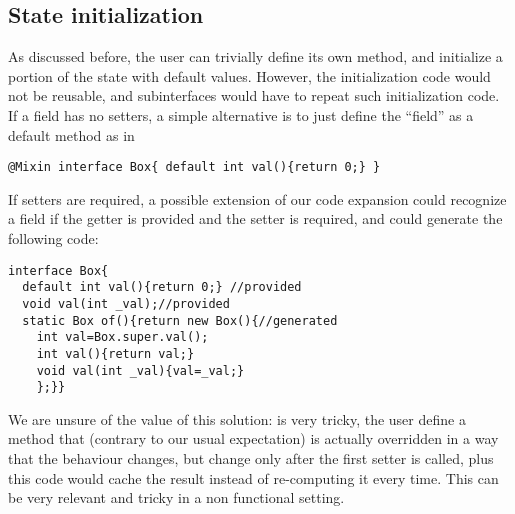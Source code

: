 \subsection{State initialization}
As discussed before, the user can trivially define its own \Q@of@ method, and
initialize a portion of the state with default values.  However, the
initialization code would not be reusable, and subinterfaces would have
to repeat such initialization code.  If a field has no setters, a simple
alternative is to just define the ``field'' as a default method as in
\begin{lstlisting}
@Mixin interface Box{ default int val(){return 0;} }
\end{lstlisting}
If setters are required, a possible extension of our code expansion could
recognize a field if the getter is provided and the setter is required, and
could generate the following code: 
\begin{lstlisting}
interface Box{ 
  default int val(){return 0;} //provided
  void val(int _val);//provided
  static Box of(){return new Box(){//generated
    int val=Box.super.val();
    int val(){return val;}
    void val(int _val){val=_val;}
    };}}
\end{lstlisting}
We are unsure of the value of this solution: is very tricky, the user define a
method that (contrary to our usual expectation) is actually overridden in a way
that the behaviour changes, but change only after the first setter is called,
plus this code would cache the result instead of re-computing it every
time. This can be very relevant and tricky in a non functional setting.

\begin{comment}
\subsection{Class Invariants in ClassLess Java}
Since objects are created by automatically generated methods, another limitation
of our current approach is that there is no place where the user can dynamically
check for class invariants. In Java often we see code like
\begin{lstlisting}
class Point{ int x; int y;
  Point(int x; int y){this.x=x;this.y=y; assert this.checkInvariant();}
  private boolean checkInvariant(){... x>0,y>0...}
}
\end{lstlisting} 

We are considering an extension of our annotation where 
default methods with the special name \Q@checkInvariant()@ will be called inside the \Q@of@ methods.
If multiple interfaces are implemented, and more then one offers
\Q@checkInvariant()@,  a composed implementation could be automatically generated, composing by \Q@&&@ the various competing implementations.
\end{comment}

